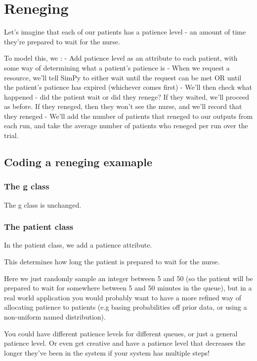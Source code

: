 \documentclass[
  letterpaper,
  DIV=11,
  numbers=noendperiod]{scrreprt}
\begin{document}
\section{Reneging}\label{reneging}

Let's imagine that each of our patients has a patience level - an amount
of time they're prepared to wait for the nurse.

To model this, we : - Add patience level as an attribute to each
patient, with some way of determining what a patient's patience is -
When we request a resource, we'll tell SimPy to either wait until the
request can be met OR until the patient's patience has expired
(whichever comes first) - We'll then check what happened - did the
patient wait or did they renege? If they waited, we'll proceed as
before. If they reneged, then they won't see the nurse, and we'll record
that they reneged - We'll add the number of patients that reneged to our
outputs from each run, and take the average number of patients who
reneged per run over the trial.

\subsection{Coding a reneging
examaple}\label{coding-a-reneging-examaple}

\subsubsection{The g class}\label{the-g-class-4}

The g class is unchanged.

\subsubsection{The patient class}\label{the-patient-class-4}

In the patient class, we add a patience attribute.

This determines how long the patient is prepared to wait for the nurse.

Here we just randomly sample an integer between 5 and 50 (so the patient
will be prepared to wait for somewhere between 5 and 50 minutes in the
queue), but in a real world application you would probably want to have
a more refined way of allocating patience to patients (e.g basing
probabilities off prior data, or using a non-uniform named
distribution).

You could have different patience levels for different queues, or just a
general patience level. Or even get creative and have a patience level
that decreases the longer they've been in the system if your system has
multiple steps!
\end{document}
